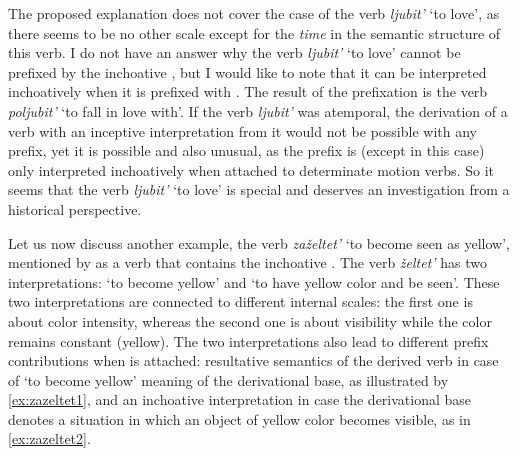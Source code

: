 The proposed explanation does not cover the case of the verb \textit{ljubit'} `to love', as there seems to be no other scale except for the \textit{time} in the semantic structure of this verb. I do not have an answer why the verb \textit{ljubit'} `to love' cannot be prefixed by the inchoative , but I would like to note that it can be interpreted inchoatively when it is prefixed with . The result of the prefixation is the verb \textit{poljubit'} `to fall in love with'. If the verb \textit{ljubit'} was atemporal, the derivation of a verb with an inceptive interpretation from it would not be possible with any prefix, yet it is possible and also unusual, as the prefix  is (except in this case) only interpreted inchoatively when attached to determinate motion verbs. So it seems that the verb \textit{ljubit'} `to love' is special and deserves an investigation from a historical perspective. 

Let us now discuss another example, the verb \textit{za\v{z}eltet'} `to become seen as yellow', mentioned by \citet{Braginsky:08} as a verb that contains the inchoative {.} The verb \textit{\v{z}eltet'} has two interpretations: `to become yellow' and `to have yellow color and be seen'. These two interpretations are connected to different internal scales: the first one is about color intensity, whereas the second one is about visibility while the color remains constant (yellow). The two interpretations also lead to different prefix contributions when  is attached: resultative semantics of the derived verb in case of `to become yellow' meaning of the derivational base, as illustrated by \ref{ex:zazeltet1}, and an inchoative interpretation in case the derivational base denotes a  situation in which an object of yellow color becomes visible, as in \ref{ex:zazeltet2}.


